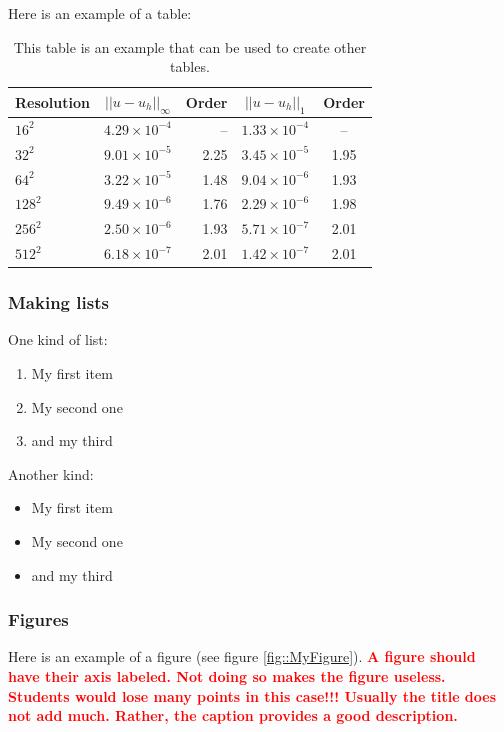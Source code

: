 \documentclass[12pt]{article}
\begin{document}
Here is an example of a table:
\begin{table}[bht]
\begin{center}
\begin{tabular}{|l|c|r|c|c|}
\hline
Resolution & $||u - u_{h} ||_{\infty}$ & Order & $|| u - u_{h} ||_{1}$ & Order \\ \hline
  $16^{2}$ & $4.29\times10^{-4}$& -- & $1.33\times10^{-4}$ & -- \\ \hline
  $32^{2}$ & $9.01\times10^{-5}$& 2.25 & $3.45\times10^{-5}$ & 1.95 \\ \hline
  $64^{2}$ & $3.22\times10^{-5}$& 1.48 & $9.04\times10^{-6}$ & 1.93 \\ \hline
  $128^{2}$ & $9.49\times10^{-6}$ & 1.76 & $2.29\times10^{-6}$ & 1.98 \\ \hline
  $256^{2}$ & $2.50\times10^{-6}$ & 1.93 & $5.71\times10^{-7}$ & 2.01 \\ \hline
  $512^{2}$ & $6.18\times10^{-7}$& 2.01 & $1.42\times10^{-7}$ & 2.01 \\ \hline
\end{tabular}
\end{center}
\caption{This table is an example that can be used to create other tables.} \label{tab::A_Table}
\end{table}


\subsubsection{Making lists}\label{sec::lists}

One kind of list:
\begin{enumerate}
\item My first item
\item My second one
\item and my third
\end{enumerate}

Another kind:
\begin{itemize}
\item My first item
\item My second one
\item and my third
\end{itemize}

\subsubsection{Figures}
Here is an example of a figure (see figure \ref{fig::MyFigure}). \textcolor{red}{\bf A figure should have their axis labeled. Not doing so makes the figure useless. Students would lose many points in this case!!! Usually the title does not add much. Rather, the caption provides a good description.}
\end{document}
